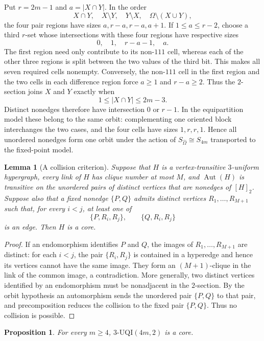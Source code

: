 \documentclass[11pt]{article}
\newtheorem{lemma}[theorem]{Lemma}
\newtheorem{proposition}[theorem]{Proposition}
\DeclareMathOperator{\Aut}{Aut}
\begin{document}
Put \(r=2m-1\) and \(a=|X\cap Y|\).  In the order
\[
X\cap Y,\quad X\setminus Y,\quad Y\setminus X,\quad
\Omega\setminus(X\cup Y),
\]
the four pair regions have sizes \(a,r-a,r-a,a+1\).  If
\(1\le a\le r-2\), choose a third \(r\)-set whose intersections with these
four regions have respective sizes
\[
0,\quad 1,\quad r-a-1,\quad a.
\]
The first region need only contribute to its
non-\(111\) cell, whereas each of the other three regions is split between
the two values of the third bit.  This makes all seven required cells
nonempty.  Conversely, the non-\(111\) cell in the first region and the two
cells in each difference region force \(a\ge1\) and \(r-a\ge2\).  Thus the
\(2\)-section joins \(X\) and \(Y\) exactly when
\[
1\le |X\cap Y|\le2m-3.
\]
Distinct nonedges therefore have intersection \(0\) or \(r-1\).  In the
equipartition model these belong to the same orbit: complementing one
oriented block interchanges the two cases, and the four cells have sizes
\(1,r,r,1\).  Hence all unordered nonedges form one orbit under the action of
\(S_{\widehat\Omega}\cong S_{4m}\) transported to the fixed-point model.

\begin{lemma}[A collision criterion]\label{lem:critical-fold}
Suppose that \(H\) is a vertex-transitive \(3\)-uniform hypergraph, every
link of \(H\) has clique number at most \(M\), and \(\Aut(H)\) is transitive
on the unordered pairs of distinct vertices that are nonedges of \([H]_2\).
Suppose
also that a fixed nonedge \(\{P,Q\}\) admits distinct vertices
\(R_1,\ldots,R_{M+1}\) such that, for every \(i<j\), at least one of
\[
\{P,R_i,R_j\},\qquad \{Q,R_i,R_j\}
\]
is an edge.  Then \(H\) is a core.
\end{lemma}

\begin{proof}
If an endomorphism identifies \(P\) and \(Q\), the images of
\(R_1,\ldots,R_{M+1}\) are distinct: for each \(i<j\), the pair
\(\{R_i,R_j\}\) is contained in a hyperedge and hence its vertices cannot
have the same image.  They form an
\((M+1)\)-clique in the link of the common image, a contradiction.  More
generally, two distinct vertices identified by an endomorphism must be
nonadjacent in the \(2\)-section.  By the orbit hypothesis an automorphism
sends the unordered pair \(\{P,Q\}\) to that pair, and precomposition reduces
the collision to the fixed pair \(\{P,Q\}\).  Thus no collision is possible.
\end{proof}

\begin{proposition}\label{prop:4m}
For every \(m\ge4\), \(3\text{-}\mathrm{UQI}(4m,2)\) is a core.
\end{proposition}
\end{document}
